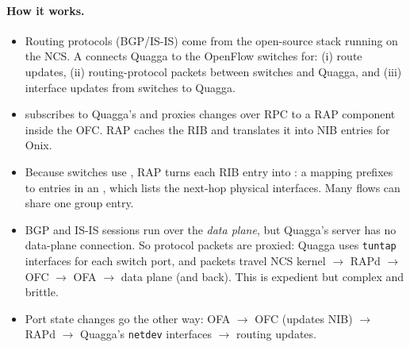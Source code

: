 \paragraph{How it works.}
\begin{itemize}
\item Routing protocols (BGP/IS-IS) come from the open-source  stack running on the NCS. A  connects Quagga to the OpenFlow switches for: (i) route updates, (ii) routing-protocol packets between switches and Quagga, and (iii) interface updates from switches to Quagga.
\item {} subscribes to Quagga's  and proxies changes over RPC to a RAP component inside the OFC. RAP caches the RIB and translates it into NIB entries for Onix.
\item Because switches use , RAP turns each RIB entry into : a  mapping prefixes to entries in an , which lists the next-hop physical interfaces. Many flows can share one group entry.
\item BGP and IS-IS sessions run over the \emph{data plane}, but Quagga's server has no data-plane connection. So protocol packets are proxied: Quagga uses \texttt{tuntap} interfaces for each switch port, and packets travel NCS kernel $\to$ RAPd $\to$ OFC $\to$ OFA $\to$ data plane (and back). This is expedient but complex and brittle.
\item Port state changes go the other way: OFA $\to$ OFC (updates NIB) $\to$ RAPd $\to$ Quagga's \texttt{netdev} interfaces $\to$ routing updates.
\end{itemize}

